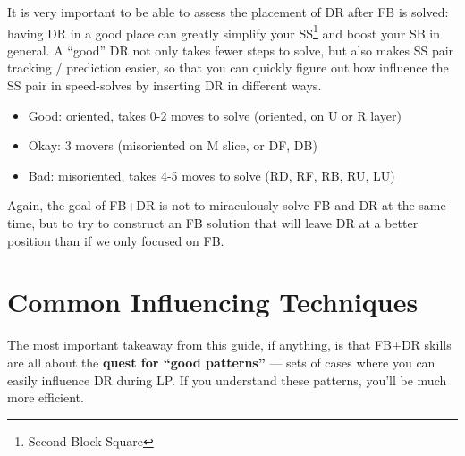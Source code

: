 \documentclass[12pt,letter]{article}
\begin{document}
It is very important to be able to assess the placement of DR after FB is solved: having DR in a good place can greatly simplify your SS\footnote{Second Block Square} and boost your SB in general. A ``good'' DR not only takes fewer steps to solve, but also makes SS pair tracking / prediction easier, so that you can quickly figure out how influence the SS pair in speed-solves by inserting DR in different ways.

\begin{itemize}
    \item Good: oriented, takes 0-2 moves to solve (oriented, on U or R layer)
    \item Okay: 3 movers (misoriented on M slice, or DF, DB)
    \item Bad: misoriented, takes 4-5 moves to solve (RD, RF, RB, RU, LU)
\end{itemize}
    
Again, the goal of FB+DR is not to miraculously solve FB and DR at the same time, but to try to construct an FB solution that will leave DR at a better position than if we only focused on FB.

\section{Common Influencing Techniques}\label{influencing}

The most important takeaway from this guide, if anything, is that FB+DR skills are all about the \textbf{quest for “good patterns”} --- sets of cases where you can easily influence DR during LP. If you understand these patterns, you'll be much more efficient. 




    
\end{document}

